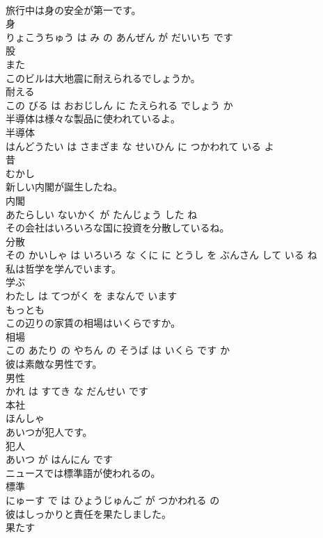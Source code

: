 \documentclass[8pt]{extreport}
\begin{document}
\begin{CJK}{UTF8}{min}
\\	旅行中は身の安全が第一です。	
\\	身 
\\	りょこうちゅう は み の あんぜん が だいいち です			
\\	股	
\\	また		
\\	このビルは大地震に耐えられるでしょうか。	
\\	耐える 
\\	この びる は おおじしん に たえられる でしょう か			
\\	半導体は様々な製品に使われているよ。	
\\	半導体 
\\	はんどうたい は さまざま な せいひん に つかわれて いる よ			
\\	昔	
\\	むかし		
\\	新しい内閣が誕生したね。	
\\	内閣 
\\	あたらしい ないかく が たんじょう した ね			
\\	その会社はいろいろな国に投資を分散しているね。	
\\	分散 
\\	その かいしゃ は いろいろ な くに に とうし を ぶんさん して いる ね			
\\	私は哲学を学んでいます。	
\\	学ぶ 
\\	わたし は てつがく を まなんで います			
\\	もっとも	
\\	この辺りの家賃の相場はいくらですか。	
\\	相場 
\\	この あたり の やちん の そうば は いくら です か			
\\	彼は素敵な男性です。	
\\	男性 
\\	かれ は すてき な だんせい です			
\\	本社	
\\	ほんしゃ		
\\	あいつが犯人です。	
\\	犯人 
\\	あいつ が はんにん です			
\\	ニュースでは標準語が使われるの。	
\\	標準 
\\	にゅーす で は ひょうじゅんご が つかわれる の			
\\	彼はしっかりと責任を果たしました。	
\\	果たす 

\end{CJK}
\end{document}
